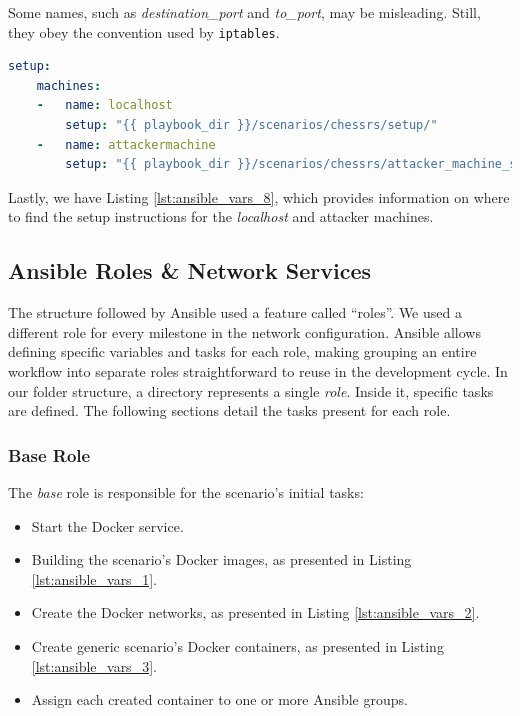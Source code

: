 Some names, such as \textit{destination\_port} and \textit{to\_port}, may be misleading. Still, they obey the convention used by \texttt{iptables}.

\begin{lstlisting}[language=yaml,caption=Ansible Variables - Setup Section.,numbers=none,label={lst:ansible_vars_8}]
setup:
    machines:
    -   name: localhost
        setup: "{{ playbook_dir }}/scenarios/chessrs/setup/"
    -   name: attackermachine
        setup: "{{ playbook_dir }}/scenarios/chessrs/attacker_machine_setup/*.j2"
\end{lstlisting}

Lastly, we have Listing \ref{lst:ansible_vars_8}, which provides information on where to find the setup instructions for the \textit{localhost} and attacker machines.

\subsection{Ansible Roles \& Network Services} \label{sec:ansible_roles}

The structure followed by Ansible used a feature called ``roles''. We used a different role for every milestone in the network configuration. Ansible allows defining specific variables and tasks for each role, making grouping an entire workflow into separate roles straightforward to reuse in the development cycle. In our folder structure, a directory represents a single \textit{role}. Inside it, specific tasks are defined. The following sections detail the tasks present for each role. 

\subsubsection{Base Role} \label{sec:ansible_base_role}

The \textit{base} role is responsible for the scenario's initial tasks:

\begin{itemize}
    \item Start the Docker service.
    \item Building the scenario's Docker images, as presented in Listing \ref{lst:ansible_vars_1}.
    \item Create the Docker networks, as presented in Listing \ref{lst:ansible_vars_2}.
    \item Create generic scenario's Docker containers, as presented in Listing \ref{lst:ansible_vars_3}.
    \item Assign each created container to one or more Ansible groups.
\end{itemize}

